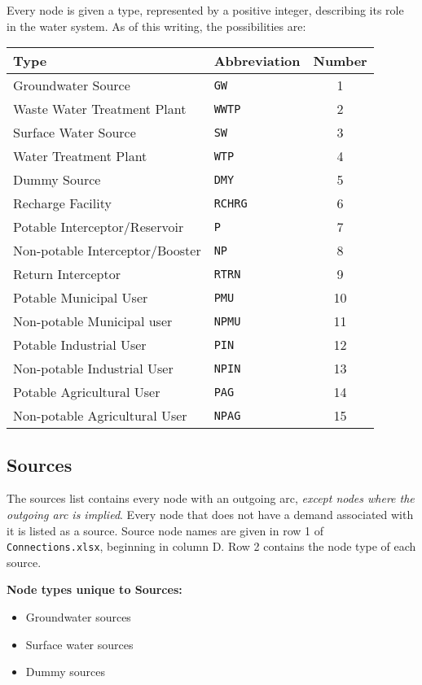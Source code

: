 \documentclass[11pt]{article}
\newcommand{\connections}{\texttt{Connections.xlsx}}
\begin{document}
Every node is given a type, represented by a positive integer, describing its role in the water system.
As of this writing, the possibilities are:
\begin{center}
	\begin{tabular}{|l|l|c|}
		\hline
		Type										& Abbreviation		& Number \\
		\hline
		Groundwater Source					& \texttt{GW}		& 1 \\
		Waste Water Treatment Plant		& \texttt{WWTP}	& 2 \\
		Surface Water Source					& \texttt{SW}		& 3 \\
		Water Treatment Plant				& \texttt{WTP}		& 4 \\
		Dummy Source							& \texttt{DMY}		& 5 \\
		Recharge Facility						& \texttt{RCHRG}	& 6 \\
		Potable Interceptor/Reservoir		& \texttt{P}		& 7 \\
		Non-potable Interceptor/Booster	& \texttt{NP}		& 8 \\
		Return Interceptor					& \texttt{RTRN}	& 9 \\
		Potable Municipal User				& \texttt{PMU}		& 10 \\
		Non-potable Municipal user			& \texttt{NPMU}	& 11 \\
		Potable Industrial User				& \texttt{PIN}		& 12 \\
		Non-potable Industrial User		& \texttt{NPIN}	& 13 \\
		Potable Agricultural User			& \texttt{PAG}		& 14 \\
		Non-potable Agricultural User		& \texttt{NPAG}	& 15 \\
		\hline
	\end{tabular}
\end{center}

\subsection{Sources}
\label{ssec:sources}

The sources list contains every node with an outgoing arc, \emph{except nodes where the outgoing arc is implied}.
Every node that does not have a demand associated with it is listed as a source.
Source node names are given in row 1 of \connections, beginning in column D.
Row 2 contains the node type of each source.

\textbf{Node types unique to Sources:}
\begin{itemize}
	\item Groundwater sources
	\item Surface water sources
	\item Dummy sources
\end{itemize}
\end{document}
